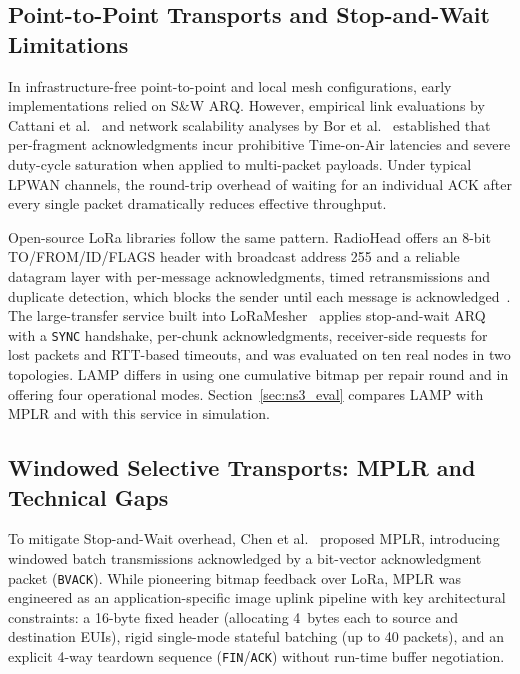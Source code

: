 \documentclass[journal]{IEEEtran}
\begin{document}
\subsection{Point-to-Point Transports and Stop-and-Wait Limitations}
In infrastructure-free point-to-point and local mesh configurations, early implementations relied on S\&W \ac{ARQ}. However, empirical link evaluations by Cattani et al.~\cite{cattani2017} and network scalability analyses by Bor et al.~\cite{bor2016} established that per-fragment acknowledgments incur prohibitive Time-on-Air latencies and severe duty-cycle saturation when applied to multi-packet payloads. Under typical LPWAN channels, the round-trip overhead of waiting for an individual ACK after every single packet dramatically reduces effective throughput.

Open-source \ac{LoRa} libraries follow the same pattern. RadioHead offers an 8-bit TO/FROM/ID/FLAGS header with broadcast address 255 and a reliable datagram layer with per-message acknowledgments, timed retransmissions and duplicate detection, which blocks the sender until each message is acknowledged~\cite{radiohead}. The large-transfer service built into LoRaMesher~\cite{sole2022loramesher,sole2026largetransfer} applies stop-and-wait \ac{ARQ} with a \texttt{SYNC} handshake, per-chunk acknowledgments, receiver-side requests for lost packets and RTT-based timeouts, and was evaluated on ten real nodes in two topologies. LAMP differs in using one cumulative bitmap per repair round and in offering four operational modes. Section~\ref{sec:ns3_eval} compares LAMP with MPLR and with this service in simulation.

\subsection{Windowed Selective Transports: MPLR and Technical Gaps}
To mitigate Stop-and-Wait overhead, Chen et al.~\cite{mplr-chen2019} proposed \ac{MPLR}, introducing windowed batch transmissions acknowledged by a bit-vector acknowledgment packet (\texttt{BVACK}). While pioneering bitmap feedback over LoRa, MPLR was engineered as an application-specific image uplink pipeline with key architectural constraints: a 16-byte fixed header (allocating 4~bytes each to source and destination \acp{EUI}), rigid single-mode stateful batching (up to 40 packets), and an explicit 4-way teardown sequence (\texttt{FIN}/\texttt{ACK}) without run-time buffer negotiation.
\end{document}
